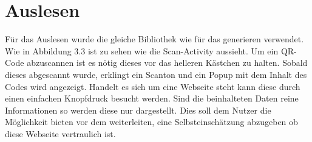 \documentclass[12pt,					%
							 oneside,			%
							 a4paper,			%
							 halfparskip,		%
							 liststotoc,			%
							 bibtotoc,			%
							 fleqn,				%
							 pointlessnumbers]	%
							 {scrreprt}
\begin{document}
\section{Auslesen}
Für das Auslesen wurde die gleiche Bibliothek wie für das generieren verwendet. Wie in Abbildung 3.3 ist zu sehen wie die Scan-Activity aussieht. Um ein QR-Code abzuscannen ist es nötig dieses vor das helleren Kästchen zu halten. Sobald dieses abgescannt wurde, erklingt ein Scanton und ein Popup mit dem Inhalt des Codes wird angezeigt. Handelt es sich um eine Webseite steht kann diese durch einen einfachen Knopfdruck besucht werden. Sind die beinhalteten Daten reine Informationen so werden diese nur dargestellt. Dies soll dem Nutzer die Möglichkeit bieten vor dem weiterleiten, eine Selbsteinschätzung abzugeben ob diese Webseite vertraulich ist.
\begin{figure}[ht]
\centering
   \begin{minipage}[b]{.4\linewidth} %
	\centering

\end{minipage}
\end{figure}
\end{document}
